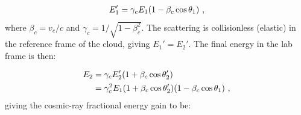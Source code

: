 \begin{equation}
    \begin{aligned}
        E_1'=\gamma_cE_1\qty(1-\beta_c\cos\theta_1)\text{ ,}
    \end{aligned}
\end{equation}
\noindent where $\beta_c=v_c/c$ and $\gamma_c=1/\sqrt{1-\beta_c^2}$. The scattering is collisionless (elastic) in the reference frame of the cloud, giving $E_1'=E_2'$. The final energy in the lab frame is then:

\begin{equation}
    \begin{aligned}
        E_2&=\gamma_c E_2'\qty(1+\beta_c\cos\theta_2') \\
        &=\gamma_c^2E_1\qty(1+\beta_c\cos\theta_2')\qty(1-\beta_c\cos\theta_1) \text{ ,}
    \end{aligned}
\end{equation}
\noindent giving the cosmic-ray fractional energy gain to be:

